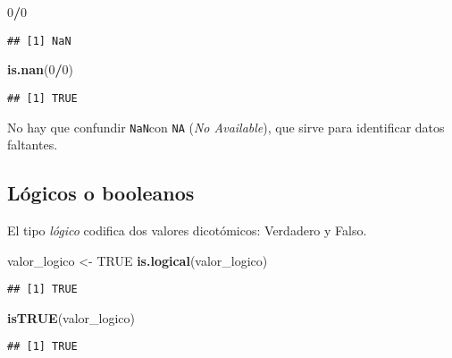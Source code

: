 \documentclass[
]{book}
\newenvironment{Shaded}{\begin{snugshade}}{\end{snugshade}}
\newcommand{\DecValTok}[1]{\textcolor[rgb]{0.00,0.00,0.81}{#1}}
\newcommand{\KeywordTok}[1]{\textcolor[rgb]{0.13,0.29,0.53}{\textbf{#1}}}
\newcommand{\NormalTok}[1]{#1}
\newcommand{\OperatorTok}[1]{\textcolor[rgb]{0.81,0.36,0.00}{\textbf{#1}}}
\newcommand{\OtherTok}[1]{\textcolor[rgb]{0.56,0.35,0.01}{#1}}
\newcommand{\StringTok}[1]{\textcolor[rgb]{0.31,0.60,0.02}{#1}}
\begin{document}
\begin{Shaded}
\begin{Highlighting}[]
\DecValTok{0}\OperatorTok{/}\DecValTok{0}
\end{Highlighting}
\end{Shaded}

\begin{verbatim}
## [1] NaN
\end{verbatim}

\begin{Shaded}
\begin{Highlighting}[]
\KeywordTok{is.nan}\NormalTok{(}\DecValTok{0}\OperatorTok{/}\DecValTok{0}\NormalTok{)}
\end{Highlighting}
\end{Shaded}

\begin{verbatim}
## [1] TRUE
\end{verbatim}

No hay que confundir \texttt{NaN}con \texttt{NA} (\emph{No Available}), que sirve para identificar datos faltantes.

\hypertarget{luxf3gicos-o-booleanos}{%
\subsection{Lógicos o booleanos}\label{luxf3gicos-o-booleanos}}

El tipo \emph{lógico} codifica dos valores dicotómicos: Verdadero y Falso.

\begin{Shaded}
\begin{Highlighting}[]
\NormalTok{valor_logico <-}\StringTok{ }\OtherTok{TRUE}
\KeywordTok{is.logical}\NormalTok{(valor_logico)}
\end{Highlighting}
\end{Shaded}

\begin{verbatim}
## [1] TRUE
\end{verbatim}

\begin{Shaded}
\begin{Highlighting}[]
\KeywordTok{isTRUE}\NormalTok{(valor_logico)}
\end{Highlighting}
\end{Shaded}

\begin{verbatim}
## [1] TRUE
\end{verbatim}
\end{document}
